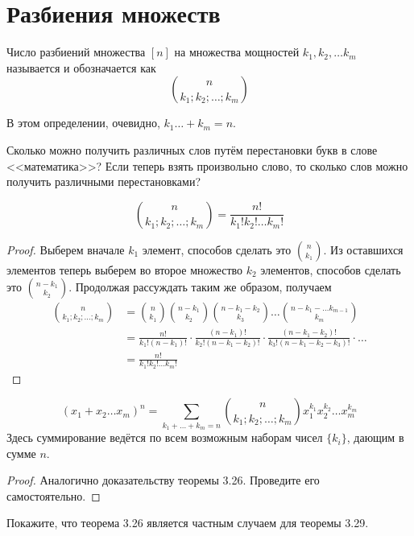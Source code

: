 \section{Разбиения множеств}

\begin{definition}
Число разбиений множества $[n]$ на множества мощностей $k_1, k_2, \ldots k_m$ называется  и обозначается как
$$n \choose k_1; k_2;\ldots; k_m$$
\end{definition}

В этом определении, очевидно, $k_1\ldots+ k_m = n$.

\begin{exercise}
Сколько можно получить различных слов путём перестановки букв в слове <<математика>>? Если теперь взять произвольно слово, то сколько слов можно получить различными перестановками?
\end{exercise}

\begin{thm}
$${n \choose k_1; k_2;\ldots; k_m} = \frac{n!}{k_1!k_2!\ldots k_m!}$$
\end{thm}
\begin{proof}
Выберем вначале $k_1$ элемент, способов сделать это $n\choose k_1$. Из оставшихся элементов теперь выберем во второе множество $k_2$ элементов, способов сделать это $n-k_1\choose k_2$. Продолжая рассуждать таким же образом, получаем
\begin{align*}
{n \choose k_1; k_2;\ldots; k_m} & = {n\choose k_1}{n-k_1\choose k_2}{n-k_1-k_2\choose k_3}\ldots{n-k_1-\ldots k_{m-1}\choose k_m} \\
&= \frac{n!}{k_1!(n-k_1)!}\cdot\frac{(n-k_1)!}{k_2!(n-k_1-k_2)!}\cdot\frac{(n-k_1-k_2)!}{k_3!(n-k_1-k_2-k_3)!}\cdot\ldots\\
&=\frac{n!}{k_1!k_2!\ldots k_m!}
\end{align*}
\end{proof}

\begin{thm}
$$(x_1+x_2\ldots x_m)^n = \sum_{k_1+\ldots + k_m = n}{n\choose k_1;k_2;\ldots;k_m}x_1^{k_1}x_2^{k_2}\ldots x_m^{k_m}$$
Здесь суммирование ведётся по всем возможным наборам чисел $\{k_i\}$, дающим в сумме $n$.
\end{thm}
\begin{proof}
Аналогично доказательству теоремы 3.26. Проведите его самостоятельно.
\end{proof}

\begin{exercise}
Покажите, что теорема 3.26 является частным случаем для теоремы 3.29.
\end{exercise}

